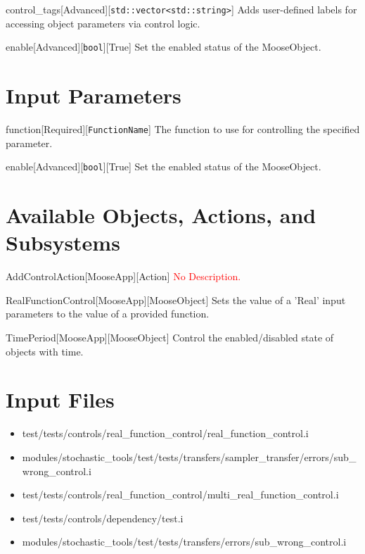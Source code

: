 \begin{InputParameter}{control\_tags}[Advanced][\texttt{std::vector{\textless}std::string{\textgreater}}]
Adds user-defined labels for accessing object parameters via control logic.
\end{InputParameter}

\begin{InputParameter}{enable}[Advanced][\texttt{bool}][True]
Set the enabled status of the MooseObject.
\end{InputParameter}

\section{\label{input-parameters}Input Parameters}
\begin{InputParameter}{function}[Required][\texttt{FunctionName}]
The function to use for controlling the specified parameter.
\end{InputParameter}

\begin{InputParameter}{enable}[Advanced][\texttt{bool}][True]
Set the enabled status of the MooseObject.
\end{InputParameter}

\section{\label{available-objects-actions-and-subsystems}Available Objects, Actions, and Subsystems}
\begin{ObjectDescription}{AddControlAction}[MooseApp][Action]
\textcolor{red}{No Description.}
\end{ObjectDescription}

\begin{ObjectDescription}{RealFunctionControl}[MooseApp][MooseObject]
Sets the value of a 'Real' input parameters to the value of a provided function.
\end{ObjectDescription}

\begin{ObjectDescription}{TimePeriod}[MooseApp][MooseObject]
Control the enabled/disabled state of objects with time.
\end{ObjectDescription}

\section{\label{input-files}Input Files}
\begin{itemize}
\item test/tests/controls/real\_function\_control/real\_function\_control.i
\item modules/stochastic\_tools/test/tests/transfers/sampler\_transfer/errors/sub\_wrong\_control.i
\item test/tests/controls/real\_function\_control/multi\_real\_function\_control.i
\item test/tests/controls/dependency/test.i
\item modules/stochastic\_tools/test/tests/transfers/errors/sub\_wrong\_control.i
\end{itemize}

